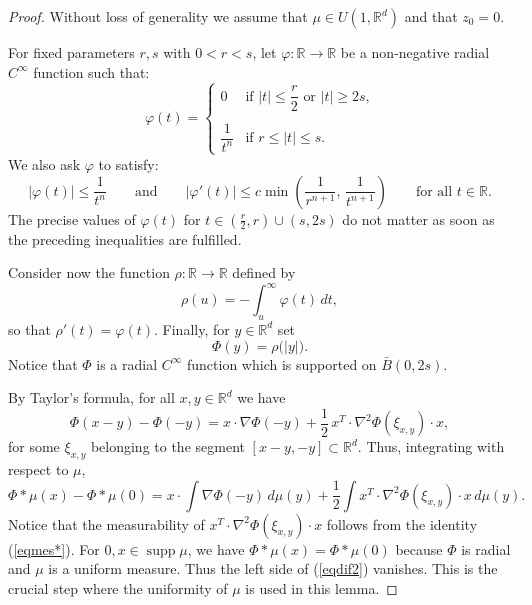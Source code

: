 \documentclass[11pt]{amsart}
\newcommand{\R}{{\mathbb R}}       %
\newcommand{\rf}[1]{{(\ref{#1})}}
\newcommand{\supp}{\operatorname{supp}}
\newcommand{\vphi}{{\varphi}}
\theoremstyle{definition}
\theoremstyle{remark}
\numberwithin{equation}{section}
\begin{document}
\begin{proof}
Without loss of generality we assume that $\mu\in U(1,\R^d)$ and that $z_0=0$.
 
For fixed parameters $r,s$ with $0<r<s$, let $\vphi:\R\to\R$ be a non-negative radial $C^\infty$ function such that:
$$\vphi(t) =\left\{
 \begin{array}{ll} 0 & \mbox{if $|t|\leq \dfrac r2$ or $|t|\geq 2s$,}\\
 &\\
\dfrac1{t^n} & \mbox{if $r\leq |t|\leq s$.}
\end{array}\right.
$$
We also ask $\vphi$ to satisfy:
$$|\vphi(t)|\leq \dfrac 1{t^n}\qquad\mbox{and}\qquad
|\vphi'(t)|\leq c\min\left(\dfrac{1}{r^{n+1}}, \,\dfrac{1}{t^{n+1}}\right) \qquad\mbox{for all $t\in\R$.}$$
The precise values of $\vphi(t)$ for $t\in(\frac r2,r)\cup(s,2s)$ do not matter as soon as the preceding
inequalities are fulfilled.

Consider now the function $\rho:\R\to\R$ defined by 
$$\rho(u) = -\int_u^{\infty}\vphi(t)\,dt,$$
so that $\rho'(t)=\vphi(t)$. Finally, for $y\in\R^d$ set
$$\Phi(y) = \rho\bigl(|y|\bigr).$$
Notice that $\Phi$ is a radial $C^\infty$ function which is supported on $\bar B(0,2s)$.

By Taylor's formula, for all $x,y\in\R^d$ we have
\begin{equation}\label{eqmes*}
\Phi(x-y) - \Phi(-y) = x\cdot \nabla \Phi(-y) + \frac12\,x^T\cdot \nabla^2\Phi(\xi_{x,y})\cdot x,
\end{equation}
for some $\xi_{x,y}$ belonging to the segment $[x-y,-y]\subset\R^d$.
Thus, integrating with respect to $\mu$,
\begin{equation}\label{eqdif2}
\Phi*\mu (x) - \Phi*\mu(0) = x\cdot\int \nabla \Phi(-y)\,d\mu(y) + \frac12 \int x^T\cdot \nabla^2\Phi(\xi_{x,y})\cdot x\,d\mu(y).
\end{equation}
Notice that the measurability of $x^T\cdot \nabla^2\Phi(\xi_{x,y})\cdot x$ follows from the identity \rf{eqmes*}.
For $0,x\in\supp\mu$, we have $\Phi*\mu (x) = \Phi*\mu(0)$ because $\Phi$ is radial and $\mu$ is a uniform measure.
Thus the left side of \rf{eqdif2} vanishes. This is the crucial step where the uniformity
of $\mu$ is used in this lemma.


\end{proof}
\end{document}
